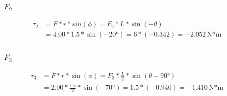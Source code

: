 \documentclass[12pt]{article}
\begin{document}
\subsubsection{$F_2$}
\begin{align*}
    \tau_2  &=  F*r*sin(\phi)
        =   F_2 * L * \sin(-\theta)\\
        &=  4.00 * 1.5 * \sin(-20\unit{\degree})
        =   6 * (-0.342)
        =   \boxed{-2.052 \unit{\newton*\meter}}
\end{align*}

\subsubsection{$F_3$}
\begin{align*}
    \tau_3  &=  F * r * \sin(\phi)
        =   F_3 * \frac{L}{2} * \sin(\theta - 90\unit{\degree})\\
        &=  2.00 * \frac{1.5}{2} * \sin(-70\unit{\degree})
        =   1.5 * (-0.940)
        =   \boxed{-1.410 \unit{\newton*\meter}}
\end{align*}
\end{document}
